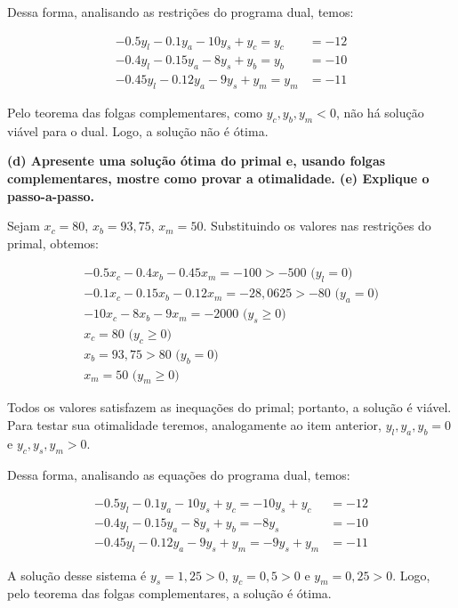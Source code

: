 \documentclass[
    12pt,
    a4paper,
    brazil,
    english
]{article}
\begin{document}
Dessa forma, analisando as restrições do programa dual, temos:

\begin{align}
    -0.5y_l - 0.1y_a - 10y_s + y_c = y_c &= -12 \\
    -0.4y_l - 0.15y_a - 8y_s + y_b = y_b &= -10 \\
    -0.45y_l - 0.12y_a - 9y_s + y_m = y_m &= -11
\end{align}

Pelo teorema das folgas complementares, como $y_c, y_b, y_m < 0$, não há solução viável para o dual. Logo, a solução não é ótima.

\vspace{0.5cm}

\textbf{(d) Apresente uma solução ótima do primal e, usando folgas complementares, mostre como provar a otimalidade. (e) Explique o passo-a-passo.}

\vspace{0.5cm}

Sejam $x_c = 80$, $x_b = 93,75$, $x_m = 50$. Substituindo os valores nas restrições do primal, obtemos:

\begin{align}
        -0.5x_c - 0.4x_b - 0.45x_m  = -100 > -500 \text{ (}y_l = 0\text{)} \\
        -0.1x_c - 0.15x_b - 0.12x_m  = -28,0625 > -80 \text{ (}y_a = 0\text{)} \\
        -10x_c - 8x_b - 9x_m  = -2000 \text{ (}y_s \geq 0\text{)} \\
    x_c = 80 \text{ (}y_c \geq 0\text{)} \\
    x_b = 93,75 > 80 \text{ (}y_b = 0\text{)} \\
    x_m = 50 \text{ (}y_m \geq 0\text{)}
\end{align}

Todos os valores satisfazem as inequações do primal; portanto, a solução é viável. Para testar sua otimalidade teremos, analogamente ao item anterior, $y_l, y_a, y_b = 0$ e $y_c, y_s, y_m > 0$. 

Dessa forma, analisando as equações do programa dual, temos:

\begin{align}
    -0.5y_l - 0.1y_a - 10y_s + y_c = -10y_s + y_c &= -12 \\
    -0.4y_l - 0.15y_a - 8y_s + y_b = -8y_s &= -10 \\
    -0.45y_l - 0.12y_a - 9y_s + y_m = -9y_s + y_m &= -11
\end{align}

A solução desse sistema é $y_s = 1,25 > 0$, $y_c = 0,5 > 0$ e $y_m = 0,25 > 0$. Logo, pelo teorema das folgas complementares, a solução é ótima.
\end{document}
